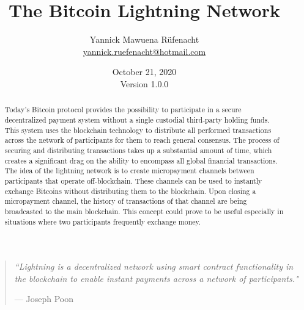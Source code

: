 \documentclass[a4paper, 12pt]{report}
\newcommand{\hsp}{\hspace{20pt}}
\begin{document}
\title{\Large{\textbf{The Bitcoin Lightning Network}}}
\author{Yannick Mawuena Rüfenacht \\ \href{mailto:yannick.ruefenacht@hotmail.com}{yannick.ruefenacht@hotmail.com}}
\date{October 21, 2020\\Version 1.0.0}
\maketitle

\begin{quote}
\vspace*{\fill}
\textit{``Lightning is a decentralized network using smart contract functionality in the blockchain to enable instant payments across a network of participants."}
\par\raggedleft--- \textup{Joseph Poon}
\vspace*{\fill}
\end{quote}

\begin{abstract}
Today’s Bitcoin protocol provides the possibility to participate in a secure decentralized payment system without a single custodial third-party holding funds. This system uses the blockchain technology to distribute all performed transactions across the network of participants for them to reach general consensus. The process of securing and distributing transactions takes up a substantial amount of time, which creates a significant drag on the ability to encompass all global financial transactions. The idea of the lightning network is to create micropayment channels between participants that operate off-blockchain. These channels can be used to instantly exchange Bitcoins without distributing them to the blockchain. Upon closing a micropayment channel, the history of transactions of that channel are being broadcasted to the main blockchain. This concept could prove to be useful especially in situations where two participants frequently exchange money.
\end{abstract}

\tableofcontents
\listoffigures

\setlength{\parskip}{1em}
\setlength{\parindent}{0em}
\titleformat{\chapter}[hang]{\LARGE\bfseries}{\thechapter\hsp\textcolor{gray75}{|}\hsp}{0pt}{\LARGE\bfseries}
\titleformat{\section}[hang]{\large\bfseries}{\thesection\hsp\textcolor{gray75}{|}\hsp}{0pt}{\large\bfseries}
\end{document}
